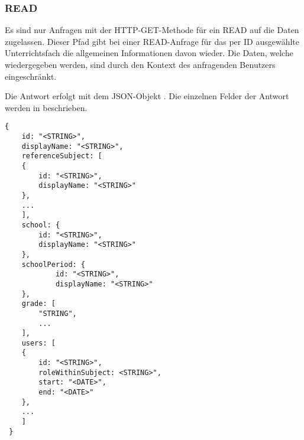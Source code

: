 \subsubsection{READ}
\label{sec:rest:api:subjects:id:read}
Es sind nur Anfragen mit der HTTP-GET-Methode für ein READ auf die Daten zugelassen.
Dieser Pfad gibt bei einer READ-Anfrage für das per ID ausgewählte Unterrichtsfach die allgemeinen Informationen davon wieder.
Die Daten, welche wiedergegeben werden, sind durch den Kontext des anfragenden Benutzers eingeschränkt.

Die Antwort erfolgt mit dem JSON-Objekt . 
Die einzelnen Felder der Antwort werden in  beschrieben.


\begin{lstlisting}[caption={JSON-Antwort für einen GET-Aufruf des Pfads /api/subjects/\$id},label={lst:code:rest:api:subjects:id:read:ret},frame=tlrb]
{
    id: "<STRING>",
    displayName: "<STRING>",
    referenceSubject: [
    {
        id: "<STRING>",
        displayName: "<STRING>"
    },
    ...
    ],
    school: {
        id: "<STRING>",
        displayName: "<STRING>"
    },
    schoolPeriod: {
            id: "<STRING>",
            displayName: "<STRING>"
    },
    grade: [
        "STRING",
        ...
    ],
    users: [
    {
        id: "<STRING>",
        roleWithinSubject: <STRING>",
        start: "<DATE>",
        end: "<DATE>"    
    },
    ...
    ]
 }
\end{lstlisting}

